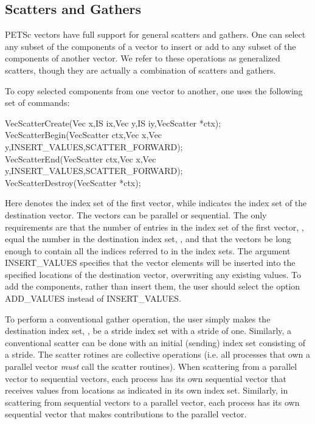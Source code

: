\subsection{Scatters and Gathers}  
\label{sec_scatter}

PETSc vectors have full support for general scatters and 
gathers. One can select any subset of the components of a vector to
insert or add to any subset of the components of another vector.
We refer to these operations as generalized scatters, though they are 
actually a combination of scatters and gathers. 

 
To copy selected components from one vector 
to another, one uses the following set of commands:
\begin{tabbing}
  VecScatterCreate(Vec x,IS ix,Vec y,IS iy,VecScatter *ctx);\\
  VecScatterBegin(VecScatter ctx,Vec x,Vec y,INSERT_VALUES,SCATTER_FORWARD);\\
  VecScatterEnd(VecScatter ctx,Vec x,Vec y,INSERT_VALUES,SCATTER_FORWARD);\\
  VecScatterDestroy(VecScatter *ctx);
\end{tabbing} 
Here  denotes the index set of the first vector, while  indicates the index set of the destination vector.  The vectors
can be parallel or sequential. The only requirements are that the
number of entries in the index set of the first vector, ,
equal the number in the destination index set, , and that the
vectors be long enough to contain all the indices referred to in the
index sets.  The argument INSERT_VALUES specifies that the
vector elements will be inserted into the specified locations of the
destination vector, overwriting any existing values.  To add the
components, rather than insert them, the user should select the option
ADD_VALUES instead of INSERT_VALUES.

To perform a conventional gather operation, the user simply makes
 the destination index set, 
, be a stride index set with a stride of one.  Similarly, a 
conventional scatter can be done with an initial (sending) index set 
consisting of a stride.  The scatter rotines are collective operations
(i.e. all processes that own 
a parallel vector {\em must} call the scatter routines). When scattering from a 
parallel vector to sequential vectors, each process has its own sequential 
vector that receives values from locations as indicated in its own 
index set. Similarly, in scattering
from sequential vectors to a parallel vector, each process has its
own sequential vector that makes contributions to the parallel vector.

